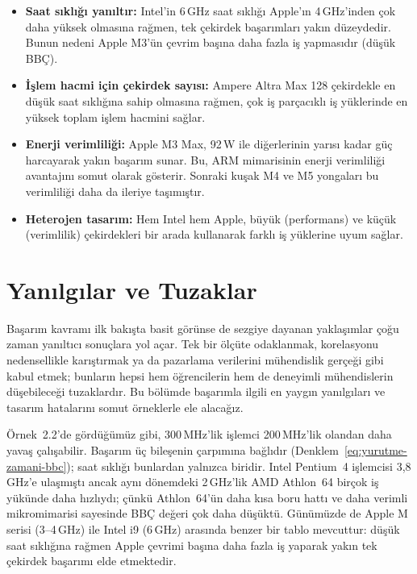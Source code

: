 \begin{itemize}
    \item \textbf{Saat sıklığı yanıltır:} Intel'in 6\,GHz saat sıklığı Apple'ın 4\,GHz'inden çok daha yüksek olmasına rağmen, tek çekirdek başarımları yakın düzeydedir. Bunun nedeni Apple M3'ün çevrim başına daha fazla iş yapmasıdır (düşük BBÇ).

    \item \textbf{İşlem hacmi için çekirdek sayısı:} Ampere Altra Max 128 çekirdekle en düşük saat sıklığına sahip olmasına rağmen, çok iş parçacıklı iş yüklerinde en yüksek toplam işlem hacmini sağlar.

    \item \textbf{Enerji verimliliği:} Apple M3 Max, 92\,W ile diğerlerinin yarısı kadar güç harcayarak yakın başarım sunar. Bu, ARM mimarisinin enerji verimliliği avantajını somut olarak gösterir. Sonraki kuşak M4 ve M5 yongaları bu verimliliği daha da ileriye taşımıştır.

    \item \textbf{Heterojen tasarım:} Hem Intel hem Apple, büyük (performans) ve küçük (verimlilik) çekirdekleri bir arada kullanarak farklı iş yüklerine uyum sağlar.
\end{itemize}


\section{Yanılgılar ve Tuzaklar}
\label{sec:yanilgilar-tuzaklar}

Başarım kavramı ilk bakışta basit görünse de sezgiye dayanan yaklaşımlar çoğu zaman yanıltıcı sonuçlara yol açar. Tek bir ölçüte odaklanmak, korelasyonu nedensellikle karıştırmak ya da pazarlama verilerini mühendislik gerçeği gibi kabul etmek; bunların hepsi hem öğrencilerin hem de deneyimli mühendislerin düşebileceği tuzaklardır. Bu bölümde başarımla ilgili en yaygın yanılgıları ve tasarım hatalarını somut örneklerle ele alacağız.

Örnek~2.2'de gördüğümüz gibi, 300\,MHz'lik işlemci 200\,MHz'lik olandan daha yavaş çalışabilir. Başarım üç bileşenin çarpımına bağlıdır (Denklem~\ref{eq:yurutme-zamani-bbc}); saat sıklığı bunlardan yalnızca biridir. Intel Pentium~4 işlemcisi 3,8\,GHz'e ulaşmıştı ancak aynı dönemdeki 2\,GHz'lik AMD Athlon~64 birçok iş yükünde daha hızlıydı; çünkü Athlon~64'ün daha kısa boru hattı ve daha verimli mikromimarisi sayesinde BBÇ değeri çok daha düşüktü. Günümüzde de Apple M serisi (3--4\,GHz) ile Intel i9 (6\,GHz) arasında benzer bir tablo mevcuttur: düşük saat sıklığına rağmen Apple çevrimi başına daha fazla iş yaparak yakın tek çekirdek başarımı elde etmektedir.

